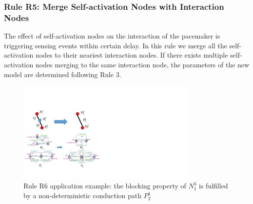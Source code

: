 \subsubsection{Rule R5: Merge Self-activation Nodes with Interaction Nodes}
The effect of self-activation nodes on the interaction of the pacemaker is triggering sensing events within certain delay. In this rule we merge all the self-activation nodes to their neariest interaction nodes. If there exists multiple self-activation nodes merging to the same interaction node, the parameters of the new model are determined following Rule 3.
\begin{figure}[!t]
	\centering
	\includegraphics[width=0.8\textwidth]{figs/rule6.pdf}
	\caption{\small Rule R6 application example: the blocking property of $N_1^3$ is fulfilled by a non-deterministic conduction path $P_2^1$}
	\label{fig:rule6}
\end{figure}
